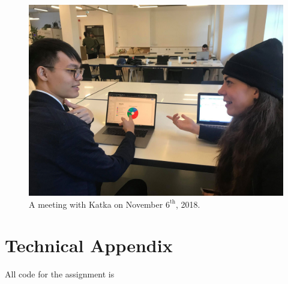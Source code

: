 \documentclass{article}
\begin{document}
	
\begin{figure}[h]
\center
\includegraphics[scale = 0.2]{katka.jpg}
\caption{A meeting with Katka on November $6^{\textrm{th}}$, 2018.}
\end{figure}

\section*{Technical Appendix}
All code for the assignment is 





	
\end{document}
